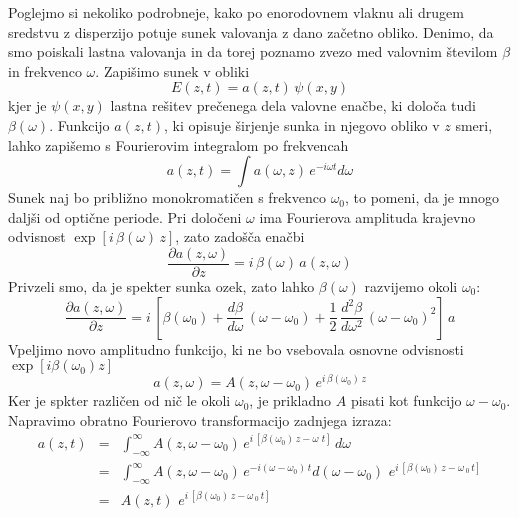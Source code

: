 Poglejmo si nekoliko podrobneje, kako po enorodovnem vlaknu ali drugem
sredstvu z disperzijo potuje sunek valovanja z dano začetno obliko.
Denimo, da smo poiskali lastna valovanja in da torej poznamo zvezo
med valovnim številom $\beta$ in frekvenco $\omega$. Zapišimo sunek
v obliki 
\begin{equation}
E\left(z,t\right)=a\left(z,t\right)\,\psi\left(x,y\right)\label{9.61}
\end{equation}
 kjer je $\psi\left(x,y\right)$ lastna rešitev prečenega dela valovne
enačbe, ki določa tudi $\beta\left(\omega\right)$. Funkcijo $a\left(z,t\right)$,
ki opisuje širjenje sunka in njegovo obliko v $z$ smeri, lahko zapišemo
s Fourierovim integralom po frekvencah 
\begin{equation}
a\left(z,t\right)=\int a(\omega,z)\, e^{-i\omega t}d\omega\label{9.62}
\end{equation}
 Sunek naj bo približno monokromatičen s frekvenco $\omega_{0}$,
to pomeni, da je mnogo daljši od optične periode. Pri določeni $\omega$
ima Fourierova amplituda krajevno odvisnost $\exp[i\,\beta\left(\omega\right)\, z]$,
zato zadošča enačbi 
\begin{equation}
\frac{\partial a\left(z,\omega\right)}{\partial z}=i\,\beta\left(\omega\right)\, a\left(z,\omega\right)\label{9.63}
\end{equation}
 Privzeli smo, da je spekter sunka ozek, zato lahko $\beta\left(\omega\right)$
razvijemo okoli $\omega_{0}$: 
\begin{equation}
\frac{\partial a\left(z,\omega\right)}{\partial z}=i\,\left[\beta\left(\omega_{0}\right)+\frac{d\beta}{d\omega}\,\left(\omega-\omega_{0}\right)+\frac{1}{2}\,\frac{d^{2}\beta}{d\omega^{2}}\,\left(\omega-\omega_{0}\right)^{2}\right]\, a\label{9.64}
\end{equation}
 Vpeljimo novo amplitudno funkcijo, ki ne bo vsebovala osnovne odvisnosti
$\exp[i\beta\left(\omega_{0}\right)z]$ 
\begin{equation}
a\left(z,\omega\right)=A\left(z,\omega-\omega_{0}\right)\, e^{i\,\beta\left(\omega_{0}\right)\, z}\label{9.65}
\end{equation}
 Ker je spkter različen od nič le okoli $\omega_{0}$, je prikladno
$A$ pisati kot funkcijo $\omega-\omega_{0}$. Napravimo obratno Fourierovo
transformacijo zadnjega izraza: 
\begin{eqnarray}
a\left(z,t\right) & = & \int_{-\infty}^{\infty}A\left(z,\omega-\omega_{0}\right)\, e^{i\,[\beta\left(\omega_{0}\right)\, z-\omega\,\, t]}\, d\omega\label{9.66}\\
 & = & \int_{-\infty}^{\infty}A\left(z,\omega-\omega_{0}\right)\, e^{-i\left(\omega-\omega_{0}\right)\, t}d\left(\omega-\omega_{0}\right)\,\, e^{i\,[\beta\left(\omega_{0}\right)\, z-\omega\,_{0}\, t]}\nonumber \\
 & = & A\left(z,t\right)\,\, e^{i\,[\beta\left(\omega_{0}\right)\, z-\omega\,_{0}\, t]}\nonumber 
\end{eqnarray}
